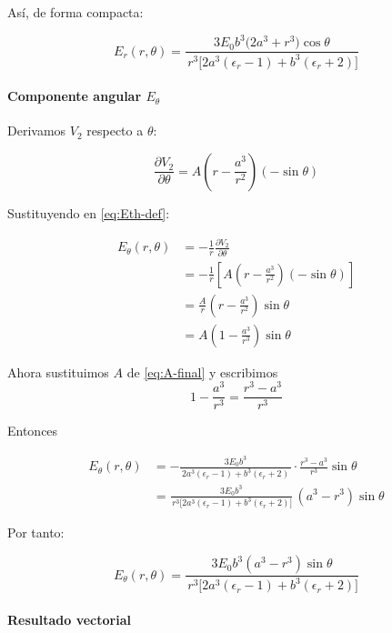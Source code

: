 \documentclass{article}
\begin{document}
Así, de forma compacta:

\begin{equation}
E_{r}(r,\theta)
= \frac{3E_{0} b^{3}\bigl(2a^{3} + r^{3}\bigr)\cos\theta}
{\,r^{3}\bigl[2a^{3}(\epsilon_{r}-1) + b^{3}(\epsilon_{r}+2)\bigr]}
\label{eq:Er-final}
\end{equation}

\paragraph{Componente angular $E_{\theta}$}

Derivamos $V_{2}$ respecto a $\theta$:

\[
\frac{\partial V_{2}}{\partial\theta}
= A\left(r - \frac{a^{3}}{r^{2}}\right)(-\sin\theta)
\]

Sustituyendo en \eqref{eq:Eth-def}:

\begin{align}
E_{\theta}(r,\theta)
&= -\frac{1}{r}\frac{\partial V_{2}}{\partial\theta}\\[4pt]
&= -\frac{1}{r}\left[A\left(r - \frac{a^{3}}{r^{2}}\right)(-\sin\theta)\right]\\[4pt]
&= \frac{A}{r}\left(r - \frac{a^{3}}{r^{2}}\right)\sin\theta\\[4pt]
&= A\left(1 - \frac{a^{3}}{r^{3}}\right)\sin\theta
\label{eq:Eth-con-A}
\end{align}

Ahora sustituimos $A$ de \eqref{eq:A-final} y escribimos
\[
1 - \frac{a^{3}}{r^{3}} = \frac{r^{3} - a^{3}}{r^{3}}
\]

Entonces

\begin{align}
E_{\theta}(r,\theta)
&= -\frac{3E_{0}b^{3}}{\,2a^{3}(\epsilon_{r}-1) + b^{3}(\epsilon_{r}+2)\,}
   \cdot \frac{r^{3} - a^{3}}{r^{3}}\sin\theta\\[4pt]
&= \frac{3E_{0}b^{3}}{\,r^{3}\bigl[2a^{3}(\epsilon_{r}-1) + b^{3}(\epsilon_{r}+2)\bigr]}\,
   (a^{3} - r^{3})\sin\theta
\end{align}

Por tanto:

\begin{equation}
E_{\theta}(r,\theta)
= \frac{3E_{0} b^{3}(a^{3} - r^{3})\sin\theta}
{\,r^{3}\bigl[2a^{3}(\epsilon_{r}-1) + b^{3}(\epsilon_{r}+2)\bigr]}
\label{eq:Eth-final}
\end{equation}

\paragraph{Resultado vectorial}
\end{document}
